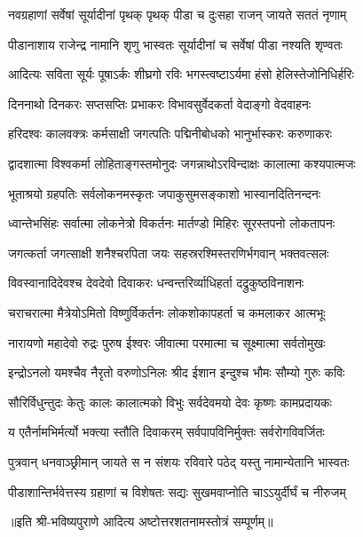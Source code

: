 

\twolineshloka
{नवग्रहाणां सर्वेषां सूर्यादीनां पृथक् पृथक्}
{पीडा च दुःसहा राजन् जायते सततं नृणाम्}

\twolineshloka
{पीडानाशाय राजेन्द्र नामानि शृणु भास्वतः}
{सूर्यादीनां च सर्वेषां पीडा नश्यति शृण्वतः}

\twolineshloka
{आदित्यः सविता सूर्यः पूषाऽर्कः शीघ्रगो रविः}
{भगस्त्वष्टाऽर्यमा हंसो हेलिस्तेजोनिधिर्हरिः}

\twolineshloka
{दिननाथो दिनकरः सप्तसप्तिः प्रभाकरः}
{विभावसुर्वेदकर्ता वेदाङ्गो वेदवाहनः}

\twolineshloka
{हरिदश्वः कालवक्त्रः कर्मसाक्षी जगत्पतिः}
{पद्मिनीबोधको भानुर्भास्करः करुणाकरः}

\twolineshloka
{द्वादशात्मा विश्वकर्मा लोहिताङ्गस्तमोनुदः}
{जगन्नाथोऽरविन्दाक्षः कालात्मा कश्यपात्मजः}

\twolineshloka
{भूताश्रयो ग्रहपतिः सर्वलोकनमस्कृतः}
{जपाकुसुमसङ्काशो भास्वानदितिनन्दनः}

\twolineshloka
{ध्वान्तेभसिंहः सर्वात्मा लोकनेत्रो विकर्तनः}
{मार्तण्डो मिहिरः सूरस्तपनो लोकतापनः}

\twolineshloka
{जगत्कर्ता जगत्साक्षी शनैश्चरपिता जयः}
{सहस्ररश्मिस्तरणिर्भगवान् भक्तवत्सलः}

\twolineshloka
{विवस्वानादिदेवश्च देवदेवो दिवाकरः}
{धन्वन्तरिर्व्याधिहर्ता दद्रुकुष्ठविनाशनः}

\twolineshloka
{चराचरात्मा मैत्रेयोऽमितो विष्णुर्विकर्तनः}
{लोकशोकापहर्ता च कमलाकर आत्मभूः}

\twolineshloka
{नारायणो महादेवो रुद्रः पुरुष ईश्वरः}
{जीवात्मा परमात्मा च सूक्ष्मात्मा सर्वतोमुखः}

\twolineshloka
{इन्द्रोऽनलो यमश्चैव नैरृतो वरुणोऽनिलः}
{श्रीद ईशान इन्दुश्च भौमः सौम्यो गुरुः कविः}

\twolineshloka
{सौरिर्विधुन्तुदः केतुः कालः कालात्मको विभुः}
{सर्वदेवमयो देवः कृष्णः कामप्रदायकः}

\twolineshloka
{य एतैर्नामभिर्मर्त्यो भक्त्या स्तौति दिवाकरम्}
{सर्वपापविनिर्मुक्तः सर्वरोगविवर्जितः}

\twolineshloka
{पुत्रवान् धनवाञ्छ्रीमान् जायते स न संशयः}
{रविवारे पठेद् यस्तु नामान्येतानि भास्वतः}

\twolineshloka
{पीडाशान्तिर्भवेत्तस्य ग्रहाणां च विशेषतः}
{सद्यः सुखमवाप्नोति चाऽऽयुर्दीर्घं च नीरुजम्}

॥इति श्री-भविष्यपुराणे आदित्य अष्टोत्तरशतनामस्तोत्रं सम्पूर्णम्॥